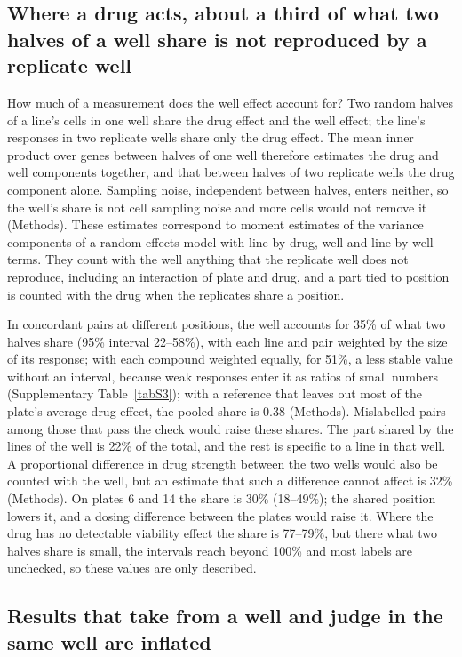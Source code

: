 \documentclass[pdflatex,sn-nature]{sn-jnl}
\begin{document}
\subsection{Where a drug acts, about a third of what two halves of a well share is not reproduced by a replicate well}

How much of a measurement does the well effect account for? Two random halves of a line's cells in one well share the drug effect and the well effect; the line's responses in two replicate wells share only the drug effect. The mean inner product over genes between halves of one well therefore estimates the drug and well components together, and that between halves of two replicate wells the drug component alone. Sampling noise, independent between halves, enters neither, so the well's share is not cell sampling noise and more cells would not remove it (Methods). These estimates correspond to moment estimates of the variance components of a random-effects model with line-by-drug, well and line-by-well terms. They count with the well anything that the replicate well does not reproduce, including an interaction of plate and drug, and a part tied to position is counted with the drug when the replicates share a position.

In concordant pairs at different positions, the well accounts for 35\% of what two halves share (95\% interval 22--58\%), with each line and pair weighted by the size of its response; with each compound weighted equally, for 51\%, a less stable value without an interval, because weak responses enter it as ratios of small numbers (Supplementary Table~\ref{tabS3}); with a reference that leaves out most of the plate's average drug effect, the pooled share is 0.38 (Methods). Mislabelled pairs among those that pass the check would raise these shares. The part shared by the lines of the well is 22\% of the total, and the rest is specific to a line in that well. A proportional difference in drug strength between the two wells would also be counted with the well, but an estimate that such a difference cannot affect is 32\% (Methods). On plates 6 and 14 the share is 30\% (18--49\%); the shared position lowers it, and a dosing difference between the plates would raise it. Where the drug has no detectable viability effect the share is 77--79\%, but there what two halves share is small, the intervals reach beyond 100\% and most labels are unchecked, so these values are only described.

\subsection{Results that take from a well and judge in the same well are inflated}
\end{document}
